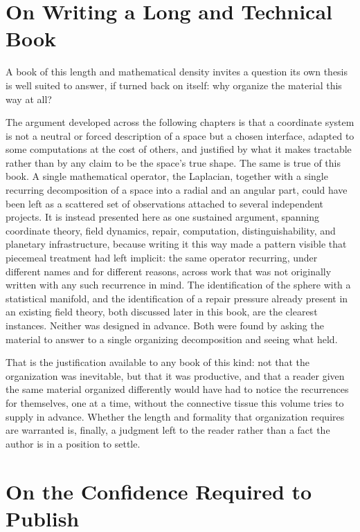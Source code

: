 \documentclass[11pt,fleqn]{book}
\numberwithin{equation}{chapter}
\theoremstyle{plain}
\theoremstyle{definition}
\theoremstyle{remark}
\begin{document}
\section*{On Writing a Long and Technical Book}

A book of this length and mathematical density invites a question its own thesis is well suited to answer, if turned back on itself: why organize the material this way at all?

The argument developed across the following chapters is that a coordinate system is not a neutral or forced description of a space but a chosen interface, adapted to some computations at the cost of others, and justified by what it makes tractable rather than by any claim to be the space's true shape. The same is true of this book. A single mathematical operator, the Laplacian, together with a single recurring decomposition of a space into a radial and an angular part, could have been left as a scattered set of observations attached to several independent projects. It is instead presented here as one sustained argument, spanning coordinate theory, field dynamics, repair, computation, distinguishability, and planetary infrastructure, because writing it this way made a pattern visible that piecemeal treatment had left implicit: the same operator recurring, under different names and for different reasons, across work that was not originally written with any such recurrence in mind. The identification of the sphere with a statistical manifold, and the identification of a repair pressure already present in an existing field theory, both discussed later in this book, are the clearest instances. Neither was designed in advance. Both were found by asking the material to answer to a single organizing decomposition and seeing what held.

That is the justification available to any book of this kind: not that the organization was inevitable, but that it was productive, and that a reader given the same material organized differently would have had to notice the recurrences for themselves, one at a time, without the connective tissue this volume tries to supply in advance. Whether the length and formality that organization requires are warranted is, finally, a judgment left to the reader rather than a fact the author is in a position to settle.

\section*{On the Confidence Required to Publish}
\end{document}
